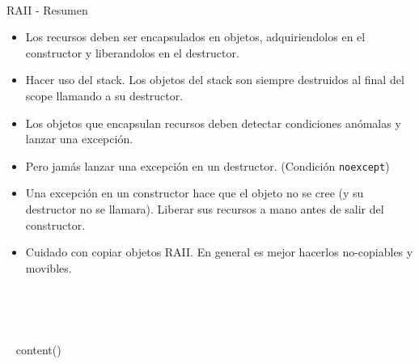 ~%
\begin{frame}[fragile]{RAII - Resumen}
   \begin{itemize}
      \item Los recursos deben ser encapsulados en objetos, adquiriendolos en el constructor y liberandolos en el destructor.
      \item Hacer uso del stack. Los objetos del stack son siempre destruidos al final del scope llamando a su destructor.
      \item Los objetos que encapsulan recursos deben detectar condiciones an\'omalas y lanzar una excepci\'on.
      \item Pero \alert{jam\'as} lanzar una excepci\'on en un destructor. (Condici\'on \lstinline[style=normal]!noexcept!)
      \item Una excepci\'on en un constructor hace que el objeto no se cree (y su destructor no se llamara). Liberar sus recursos \alert{a mano} antes de salir del constructor.
      \item Cuidado con copiar objetos RAII. En general es mejor hacerlos no-copiables y movibles.
   \end{itemize}
\end{frame}
~%

~%

~{ content() }~





